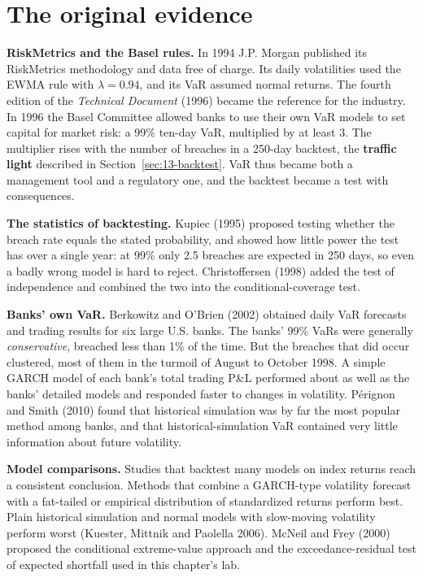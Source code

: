 \section{The original evidence}
\label{sec:13-evidence}

\textbf{RiskMetrics and the Basel rules.} In 1994 J.P. Morgan published its RiskMetrics methodology and data free of charge. Its daily volatilities used the EWMA rule with $\lambda = 0.94$, and its VaR assumed normal returns. The fourth edition of the \emph{Technical Document} (1996) became the reference for the industry. In 1996 the Basel Committee allowed banks to use their own VaR models to set capital for market risk: a 99\% ten-day VaR, multiplied by at least 3. The multiplier rises with the number of breaches in a 250-day backtest, the \textbf{traffic light} described in Section~\ref{sec:13-backtest}. VaR thus became both a management tool and a regulatory one, and the backtest became a test with consequences.

\textbf{The statistics of backtesting.} Kupiec (1995) proposed testing whether the breach rate equals the stated probability, and showed how little power the test has over a single year: at 99\% only 2.5 breaches are expected in 250 days, so even a badly wrong model is hard to reject. Christoffersen (1998) added the test of independence and combined the two into the conditional-coverage test.

\textbf{Banks' own VaR.} Berkowitz and O'Brien (2002) obtained daily VaR forecasts and trading results for six large U.S. banks. The banks' 99\% VaRs were generally \emph{conservative}, breached less than 1\% of the time. But the breaches that did occur clustered, most of them in the turmoil of August to October 1998. A simple GARCH model of each bank's total trading P\&L performed about as well as the banks' detailed models and responded faster to changes in volatility. P\'erignon and Smith (2010) found that historical simulation was by far the most popular method among banks, and that historical-simulation VaR contained very little information about future volatility.

\textbf{Model comparisons.} Studies that backtest many models on index returns reach a consistent conclusion. Methods that combine a GARCH-type volatility forecast with a fat-tailed or empirical distribution of standardized returns perform best. Plain historical simulation and normal models with slow-moving volatility perform worst (Kuester, Mittnik and Paolella 2006). McNeil and Frey (2000) proposed the conditional extreme-value approach and the exceedance-residual test of expected shortfall used in this chapter's lab.

